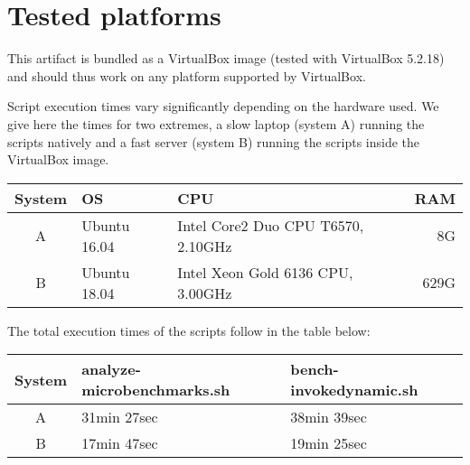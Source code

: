 \documentclass[a4paper,UKenglish]{darts-v2019}
\newenvironment{platforms}{\section{Tested platforms}}{}
\begin{document}
\begin{platforms}

This artifact is bundled as a VirtualBox image (tested with VirtualBox
5.2.18) and should thus work on any platform supported by VirtualBox.

Script execution times vary significantly depending on the hardware used.
We give here the times for two extremes, a slow laptop (system A) running
the scripts natively and a fast server (system B) running the scripts
inside the VirtualBox image.

\vspace{0.5em}
\begin{tabular}{|c|l|l|r|}
  \hline
\textbf{System} & \textbf{OS}  & \textbf{CPU}                        & \textbf{RAM} \\
  \hline
A                & Ubuntu 16.04 & Intel Core2 Duo CPU T6570, 2.10GHz & 8G           \\
  \hline
B                & Ubuntu 18.04 & Intel Xeon Gold 6136 CPU, 3.00GHz  & 629G         \\
  \hline
\end{tabular}
\vspace{0.5em}

The total execution times of the scripts follow in the table below:

\vspace{0.5em}
\begin{tabular}{|c|l|l|}
  \hline
\textbf{System} & \textbf{analyze-microbenchmarks.sh} & \textbf{bench-invokedynamic.sh} \\
  \hline
A               & 31min 27sec                         & 38min 39sec                     \\
  \hline
B               & 17min 47sec                         & 19min 25sec                     \\
  \hline
\end{tabular}
\vspace{0.5em}


  
\end{platforms}
\end{document}
